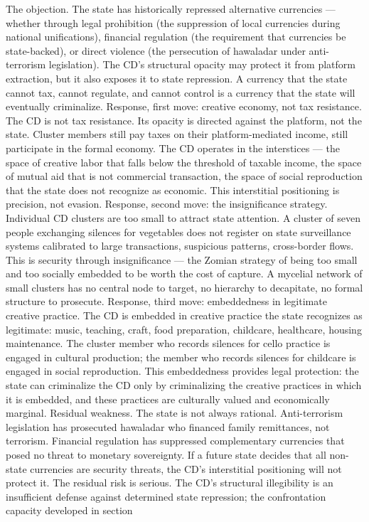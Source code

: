 The objection. The state has historically repressed alternative currencies — whether through legal prohibition (the suppression of local currencies during national unifications), financial regulation (the requirement that currencies be state-backed), or direct violence (the persecution of hawaladar under anti-terrorism legislation). The CD’s structural opacity may protect it from platform extraction, but it also exposes it to state repression. A currency that the state cannot tax, cannot regulate, and cannot control is a currency that the state will eventually criminalize. Response, first move: creative economy, not tax resistance. The CD is not tax resistance. Its opacity is directed against the platform, not the state. Cluster members still pay taxes on their platform-mediated income, still participate in the formal economy. The CD operates in the interstices — the space of creative labor that falls below the threshold of taxable income, the space of mutual aid that is not commercial transaction, the space of social reproduction that the state does not recognize as economic. This interstitial positioning is precision, not evasion. Response, second move: the insignificance strategy. Individual CD clusters are too small to attract state attention. A cluster of seven people exchanging silences for vegetables does not register on state surveillance systems calibrated to large transactions, suspicious patterns, cross-border flows. This is security through insignificance — the Zomian strategy of being too small and too socially embedded to be worth the cost of capture. A mycelial network of small clusters has no central node to target, no hierarchy to decapitate, no formal structure to prosecute. Response, third move: embeddedness in legitimate creative practice. The CD is embedded in creative practice the state recognizes as legitimate: music, teaching, craft, food preparation, childcare, healthcare, housing maintenance. The cluster member who records silences for cello practice is engaged in cultural production; the member who records silences for childcare is engaged in social reproduction. This embeddedness provides legal protection: the state can criminalize the CD only by criminalizing the creative practices in which it is embedded, and these practices are culturally valued and economically marginal. Residual weakness. The state is not always rational. Anti-terrorism legislation has prosecuted hawaladar who financed family remittances, not terrorism. Financial regulation has suppressed complementary currencies that posed no threat to monetary sovereignty. If a future state decides that all non-state currencies are security threats, the CD’s interstitial positioning will not protect it. The residual risk is serious. The CD’s structural illegibility is an insufficient defense against determined state repression; the confrontation capacity developed in section

